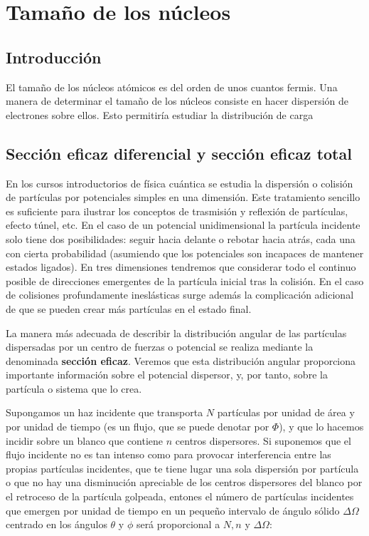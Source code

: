 \section{Tamaño de los núcleos}

\subsection{Introducción}

El tamaño de los núcleos atómicos es del orden de unos cuantos fermis. Una manera de determinar el tamaño de los núcleos consiste en hacer dispersión de electrones sobre ellos. Esto permitiría estudiar la distribución de carga 

\subsection{Sección eficaz diferencial y sección eficaz total}

En los cursos introductorios de física cuántica se estudia la dispersión o colisión de partículas por potenciales simples en una dimensión. Este tratamiento sencillo es suficiente para ilustrar los conceptos de trasmisión y reflexión de partículas, efecto túnel, etc. En el caso de un potencial unidimensional la partícula incidente solo tiene dos posibilidades: seguir hacia delante o rebotar hacia atrás, cada una con cierta probabilidad (asumiendo que los potenciales son incapaces de mantener estados ligados). En tres dimensiones tendremos que considerar todo el continuo posible de direcciones emergentes de la partícula inicial tras la colisión. En el caso de colisiones profundamente ineslásticas surge además la complicación adicional de que se pueden crear más partículas en el estado final.

La manera más adecuada de describir la distribución angular de las partículas dispersadas por un centro de fuerzas o potencial se realiza mediante la denominada \textbf{sección eficaz}. Veremos que esta distribución angular proporciona importante información sobre el potencial dispersor, y, por tanto, sobre la partícula o sistema que lo crea.

Supongamos un haz incidente que transporta $N$ partículas por unidad de área y por unidad de tiempo (es un flujo, que se puede denotar por $\Phi$), y que lo hacemos incidir sobre un blanco que contiene $n$ centros dispersores. Si suponemos que el flujo incidente no es tan intenso como para provocar interferencia entre las propias partículas incidentes, que te tiene lugar una sola dispersión por partícula o que no hay una disminución apreciable de los centros dispersores del blanco por el retroceso de la partícula golpeada, entones el número de partículas incidentes que emergen por unidad de tiempo en un pequeño intervalo de ángulo sólido $\Delta \Omega$ centrado en los ángulos $\theta$ y $\phi$ será proporcional a $N,n$ y $\Delta \Omega$:

